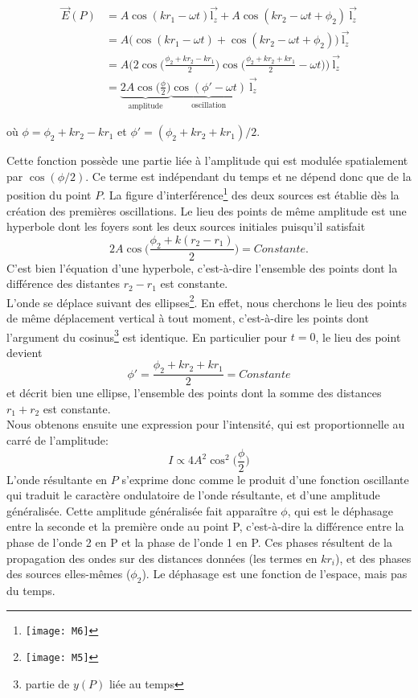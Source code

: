 \begin{align*}
\overset\rightarrow{E}(P)&=A \cos (kr_1-\omega t)\overset\rightarrow{\mbox{l}_z} + A \cos (kr_2-\omega t +\phi_2)\:\overset\rightarrow{\mbox{l}_z} \\&
=A \bigg(\cos (kr_1-\omega t)+ \cos (kr_2-\omega t +\phi_2)\bigg)\:\overset\rightarrow{\mbox{l}_z}\\&
=A \bigg(2\cos \Big(\frac{\phi_2 +kr_2-kr_1}{2}\Big)\cos \Big(\frac{\phi_2 +kr_2+kr_1}{2}-\omega t\Big)\bigg)\:\overset\rightarrow{\mbox{l}_z}\\&
=\underbrace{2A\cos \Big(\frac{\phi}{2}\Big)}_\textrm{amplitude}\underbrace{\cos (\phi'-\omega t)}_\textrm{oscillation}\:\overset\rightarrow{\mbox{l}_z}
\end{align*}

où $\phi=\phi_2 +kr_2-kr_1$ et $\phi'=(\phi_2 +kr_2+kr_1)/2$.

Cette fonction possède une partie liée à l'amplitude qui est modulée spatialement par $\cos (\phi/2)$. Ce terme est indépendant du temps et ne dépend donc que de la position du point $P$. La figure d'interférence\footnote{
\texttt{[image: M6]}} des deux sources est établie dès la création des premières oscillations.
Le lieu des points de même amplitude est une hyperbole dont les foyers sont les deux sources initiales puisqu'il satisfait
$$2A\cos \Big(\frac{\phi_2 +k(r_2-r_1)}{2}\Big)=Constante.$$
C'est bien l'équation d'une hyperbole, c'est-à-dire l'ensemble des points dont la différence des distantes $r_2-r_1$ est constante.\\

L'onde se déplace suivant des ellipses\footnote{
\texttt{[image: M5]}}. En effet, nous cherchons le lieu des points de même déplacement vertical à tout moment, c'est-à-dire les points dont l'argument du cosinus\footnote{partie de $y(P)$ liée au temps} est identique.
En particulier pour $t=0$, le lieu des point devient
$$\phi'=\frac{\phi_2 +kr_2+kr_1}{2}=Constante$$ 
et décrit bien une ellipse, l'ensemble des points dont la somme des distances $r_1+r_2$ est constante.\\

Nous obtenons ensuite une expression pour l'intensité, qui est proportionnelle au carré de l'amplitude:
$$I\propto 4A^2\cos^2 \Big(\frac{\phi}{2}\Big)$$
L'onde résultante en $P$ s'exprime donc comme le produit d'une fonction oscillante qui traduit le caractère ondulatoire de l'onde résultante, et d'une amplitude généralisée. Cette amplitude généralisée fait apparaître $\phi$, qui est le déphasage entre la seconde et la première onde au point P, c'est-à-dire la différence entre la phase de l'onde 2 en P et la phase de l'onde 1 en P. Ces phases résultent de la propagation des ondes sur des distances données (les termes en $kr_i$), et des phases des sources elles-mêmes ($\phi_2$). Le déphasage est une fonction de l'espace, mais pas du temps.

